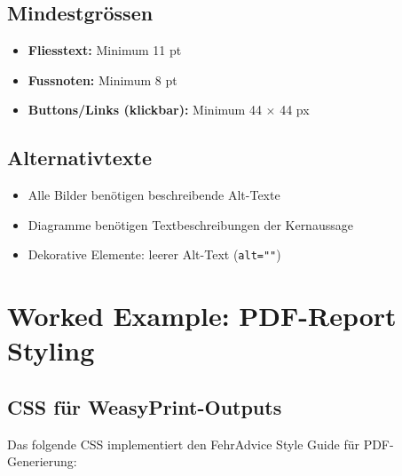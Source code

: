 \subsection{Mindestgrössen}

\begin{itemize}
    \item \textbf{Fliesstext:} Minimum 11 pt
    \item \textbf{Fussnoten:} Minimum 8 pt
    \item \textbf{Buttons/Links (klickbar):} Minimum 44 $\times$ 44 px
\end{itemize}

\subsection{Alternativtexte}

\begin{itemize}
    \item Alle Bilder benötigen beschreibende Alt-Texte
    \item Diagramme benötigen Textbeschreibungen der Kernaussage
    \item Dekorative Elemente: leerer Alt-Text (\texttt{alt=""})
\end{itemize}



\section{Worked Example: PDF-Report Styling}
\label{sec:sg-example}

\subsection{CSS für WeasyPrint-Outputs}

Das folgende CSS implementiert den FehrAdvice Style Guide für PDF-Generierung:

